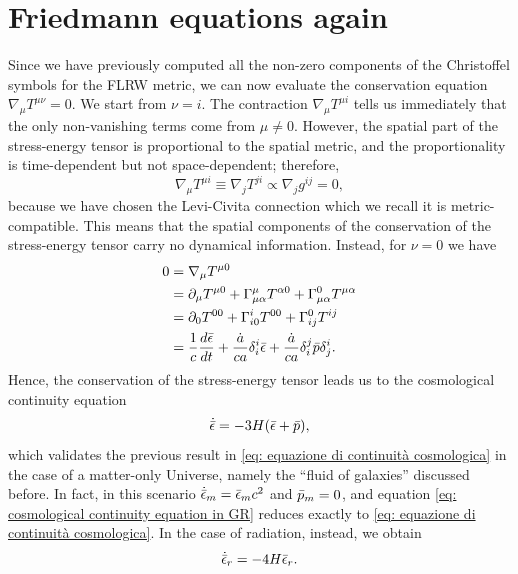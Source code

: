 \section{Friedmann equations again}
Since we have previously computed all the non-zero components of the Christoffel symbols for the FLRW metric, we can now evaluate the conservation equation $\nabla_\mu T^{\mu\nu} = 0$. We start from $\nu = i$. The contraction $\nabla_\mu T^{\mu i}$ tells us immediately that the only non-vanishing terms come from $\mu \neq 0$. However, the spatial part of the stress-energy tensor is proportional to the spatial metric, and the proportionality is time-dependent but not space-dependent; therefore,
\begin{equation}
    \nabla_\mu T^{\mu i} \equiv \nabla_j T^{ji} \propto \nabla_j g^{ij} = 0,
\end{equation} 
because we have chosen the Levi-Civita connection which we recall it is metric-compatible. This means that the spatial components of the conservation of the stress-energy tensor carry no dynamical information. Instead, for $\nu = 0$ we have 
\begin{equation}
    \begin{split}
        0 &= \nabla_\mu T^{\mu 0} \\
        &= \partial_\mu T^{\mu 0} + \Gamma^\mu_{\mu\alpha}T^{\alpha 0} + \Gamma^0_{\mu\alpha} T^{\mu\alpha} \\
        &= \partial_0 T^{00} + \Gamma^i_{i0}T^{00} + \Gamma^0_{ij}T^{ij} \\
        &= \frac{1}{c}\frac{d\bar{\epsilon}}{dt} + \frac{\dot{a}}{ca}\delta^i_i\bar{\epsilon} + \frac{\dot{a}}{ca}\delta^j_i\bar{p}\delta^i_j.
    \end{split}
\end{equation}
Hence, the conservation of the stress-energy tensor leads us to the cosmological continuity equation 
\begin{equation}
\label{eq: cosmological continuity equation in GR}
    \dot{\bar{\epsilon}} = -3H(\bar{\epsilon} + \bar{p}),
\end{equation}
which validates the previous result in \eqref{eq: equazione di continuità cosmologica} in the case of a matter-only Universe, namely the ``fluid of galaxies'' discussed before. In fact, in this scenario $\dot{\bar{\epsilon}}_m = \bar{\epsilon}_mc^2$ and $\bar{p}_m = 0$, and equation \eqref{eq: cosmological continuity equation in GR} reduces exactly to \eqref{eq: equazione di continuità cosmologica}. In the case of radiation, instead, we obtain 
\begin{equation}
    \dot{\bar{\epsilon}}_r = -4H\bar{\epsilon}_r.
\end{equation} 
